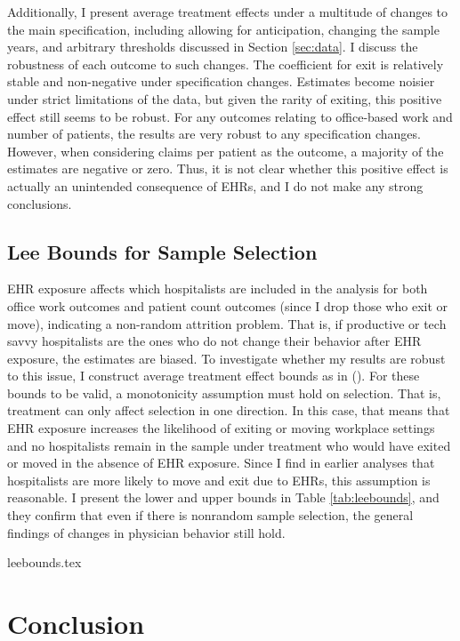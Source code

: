 \documentclass[12pt]{article}
\begin{document}
Additionally, I present average treatment effects under a multitude of changes to the main specification, including allowing for anticipation, changing the sample years, and arbitrary thresholds discussed in Section \ref{sec:data}. I discuss the robustness of each outcome to such changes. The coefficient for exit is relatively stable and non-negative under specification changes. Estimates become noisier under strict limitations of the data, but given the rarity of exiting, this positive effect still seems to be robust. For any outcomes relating to office-based work and number of patients, the results are very robust to any specification changes. However, when considering claims per patient as the outcome, a majority of the estimates are negative or zero. Thus, it is not clear whether this positive effect is actually an unintended consequence of EHRs, and I do not make any strong conclusions. 

\subsection{Lee Bounds for Sample Selection}

EHR exposure affects which hospitalists are included in the analysis for both office work outcomes and patient count outcomes (since I drop those who exit or move), indicating a non-random attrition problem. That is, if productive or tech savvy hospitalists are the ones who do not change their behavior after EHR exposure, the estimates are biased. To investigate whether my results are robust to this issue, I construct average treatment effect bounds as in  \citeauthor{lee2009training} (\citeyear{lee2009training}). For these bounds to be valid, a monotonicity assumption must hold on selection. That is, treatment can only affect selection in one direction. In this case, that means that EHR exposure increases the likelihood of exiting or moving workplace settings and no hospitalists remain in the sample under treatment who would have exited or moved in the absence of EHR exposure. Since I find in earlier analyses that hospitalists are more likely to move and exit due to EHRs, this assumption is reasonable. I present the lower and upper bounds in Table \ref{tab:leebounds}, and they confirm that even if there is nonrandom sample selection, the general findings of changes in physician behavior still hold. 

{leebounds.tex}

\section{Conclusion}
\end{document}
